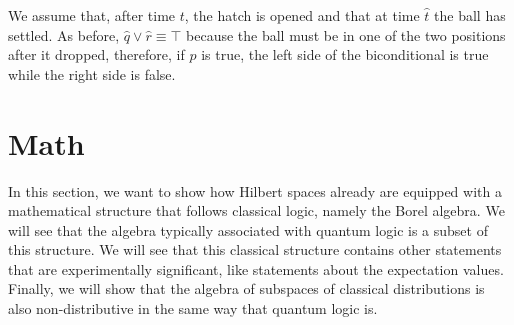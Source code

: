 \documentclass[11pt, executivepaper]{article}
\begin{document}
We assume that, after time $t$, the hatch is opened and that at time $\hat{t}$ the ball has settled. As before, $\hat{q} \vee \hat{r} \equiv \top$ because the ball must be in one of the two positions after it dropped, therefore, if $p$ is true, the left side of the biconditional is true while the right side is false.

%
%
%
%
%
%
%
%
%

\section{Math}
\label{Math}
In this section, we want to show how Hilbert spaces already are equipped with a mathematical structure that follows classical logic, namely the Borel algebra. We will see that the algebra typically associated with quantum logic is a subset of this structure. We will see that this classical structure contains other statements that are experimentally significant, like statements about the expectation values. Finally, we will show that the algebra of subspaces of classical distributions is also non-distributive in the same way that quantum logic is.
\end{document}
